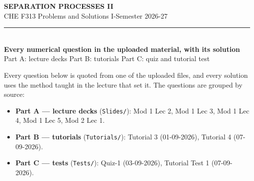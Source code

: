\documentclass[10pt,a4paper]{article}
\begin{document}
\begin{center}
{\LARGE\bfseries\color{accent} SEPARATION PROCESSES II}\\[2pt]
{\color{accent2} CHE F313 \textperiodcentered{} Problems and Solutions \textperiodcentered{} I-Semester 2026-27}\\[4pt]
{\color{rule}\rule{0.6\linewidth}{0.8pt}}\\[6pt]
{\large\bfseries\color{accent} Every numerical question in the uploaded material, with its solution}\\[3pt]
{\color{accent2} Part A: lecture decks \textperiodcentered{} Part B: tutorials \textperiodcentered{} Part C: quiz and tutorial test}
\end{center}

\vspace{1mm}
Every question below is quoted from one of the uploaded files, and every solution uses the
method taught in the lecture that set it. The questions are grouped by source:

\begin{itemize}
  \item \textbf{Part A --- lecture decks} (\texttt{Slides/}): Mod 1 Lec 2, Mod 1 Lec 3, Mod 1 Lec 4, Mod 1 Lec 5, Mod 2 Lec 1.
  \item \textbf{Part B --- tutorials} (\texttt{Tutorials/}): Tutorial 3 (01-09-2026), Tutorial 4 (07-09-2026).
  \item \textbf{Part C --- tests} (\texttt{Tests/}): Quiz-1 (03-09-2026), Tutorial Test 1 (07-09-2026).
\end{itemize}
\end{document}
